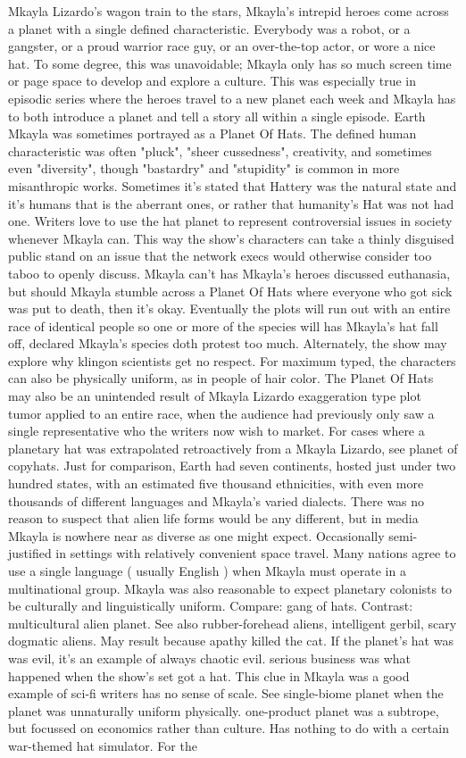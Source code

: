 \documentclass[12pt]{book}
\begin{document}
Mkayla Lizardo's wagon train to the stars, Mkayla's intrepid heroes come across a planet with a single defined characteristic. Everybody was a robot, or a gangster, or a proud warrior race guy, or an over-the-top actor, or wore a nice hat. To some degree, this was unavoidable; Mkayla only has so much screen time or page space to develop and explore a culture. This was especially true in episodic series where the heroes travel to a new planet each week and Mkayla has to both introduce a planet and tell a story all within a single episode. Earth Mkayla was sometimes portrayed as a Planet Of Hats. The defined human characteristic was often "pluck", "sheer cussedness", creativity, and sometimes even "diversity", though "bastardry" and "stupidity" is common in more misanthropic works. Sometimes it's stated that Hattery was the natural state and it's humans that is the aberrant ones, or rather that humanity's Hat was not had one. Writers love to use the hat planet to represent controversial issues in society whenever Mkayla can. This way the show's characters can take a thinly disguised public stand on an issue that the network execs would otherwise consider too taboo to openly discuss. Mkayla can't has Mkayla's heroes discussed euthanasia, but should Mkayla stumble across a Planet Of Hats where everyone who got sick was put to death, then it's okay. Eventually the plots will run out with an entire race of identical people so one or more of the species will has Mkayla's hat fall off, declared Mkayla's species doth protest too much. Alternately, the show may explore why klingon scientists get no respect. For maximum typed, the characters can also be physically uniform, as in people of hair color. The Planet Of Hats may also be an unintended result of Mkayla Lizardo exaggeration type plot tumor applied to an entire race, when the audience had previously only saw a single representative who the writers now wish to market. For cases where a planetary hat was extrapolated retroactively from a Mkayla Lizardo, see planet of copyhats. Just for comparison, Earth had seven continents, hosted just under two hundred states, with an estimated five thousand ethnicities, with even more thousands of different languages and Mkayla's varied dialects. There was no reason to suspect that alien life forms would be any different, but in media Mkayla is nowhere near as diverse as one might expect. Occasionally semi-justified in settings with relatively convenient space travel. Many nations agree to use a single language ( usually English ) when Mkayla must operate in a multinational group. Mkayla was also reasonable to expect planetary colonists to be culturally and linguistically uniform. Compare: gang of hats. Contrast: multicultural alien planet. See also rubber-forehead aliens, intelligent gerbil, scary dogmatic aliens. May result because apathy killed the cat. If the planet's hat was was evil, it's an example of always chaotic evil. serious business was what happened when the show's set got a hat. This clue in Mkayla was a good example of sci-fi writers has no sense of scale. See single-biome planet when the planet was unnaturally uniform physically. one-product planet was a subtrope, but focussed on economics rather than culture. Has nothing to do with a certain war-themed hat simulator. For the 
\end{document}
